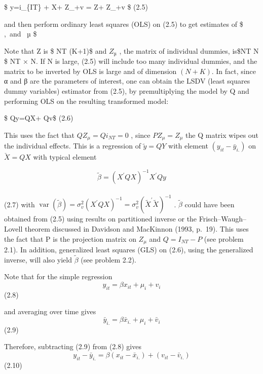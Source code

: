 \documentclass[
]{book}
\begin{document}
\$ y=\alpha i\_\{IT\} + X\beta + Z\_\mu \mu +v = Z\delta + Z\_\mu \mu +v \$ (2.5)

and then perform ordinary least squares (OLS) on (2.5) to get estimates of
\$ \alpha,\beta ~and ~µ \$

Note
that Z is \$ NT \times (K+1)\$ and \(Z_µ\) , the matrix of individual dummies, is\$NT \times N \$ NT × N. If N is large, (2.5) will include too many individual dummies, and the matrix to be inverted by OLS is large
and of dimension \((N + K)\). In fact, since α and β are the parameters of interest, one can obtain the LSDV (least squares dummy variables) estimator from (2.5), by premultiplying the model by Q and performing OLS on the resulting transformed model:

\$ Qy=QX\beta + Qv\$ (2.6)

This uses the fact that \(QZ_\mu =Qi_{NT}=0\) , since \(PZ_\mu =Z_\mu\) the Q matrix
wipes out the individual effects. This is a regression of \(\tilde y =QY\) with element \((y_{it} - \bar y _{i.} )\) on \(\check X=QX\) with typical element

\[
\widetilde{\beta}=\left(X^{\prime} Q X\right)^{-1} X^{\prime} Q y
\]\\
(2.7)
with \(\operatorname{var}(\widetilde{\beta})=\sigma_{v}^{2}\left(X^{\prime} Q X\right)^{-1}=\sigma_{v}^{2}\left(\widetilde{X}^{\prime} \tilde{X}\right)^{-1}\) .
\(\widetilde{\beta}\) could have been obtained from (2.5) using results
on partitioned inverse or the Frisch--Waugh--Lovell theorem discussed in Davidson and MacKinnon (1993, p.~19). This uses the fact that P is the projection matrix on \(Z_{\mu}\) and \(Q = I_{NT} − P\) (see problem 2.1). In addition, generalized least squares (GLS) on (2.6), using
the generalized inverse, will also yield \(\widetilde{\beta }\) (see problem 2.2).

Note that for the simple regression
\[y_{it}=\beta x_{it}+ \mu_i+ v_i     \] (2.8)

and averaging over time gives
\[  \bar {y}_{i.}= \beta \bar{x}_{i.}+ \mu_i+ \bar{v}_i   \] (2.9)

Therefore, subtracting (2.9) from (2.8) gives
\[y_{it}-\bar{y}_{i.}=\beta (x_{it}-\bar{x}_{i.}) + (v_{it}-\bar{v}_{i.})   \]
(2.10)
\end{document}

